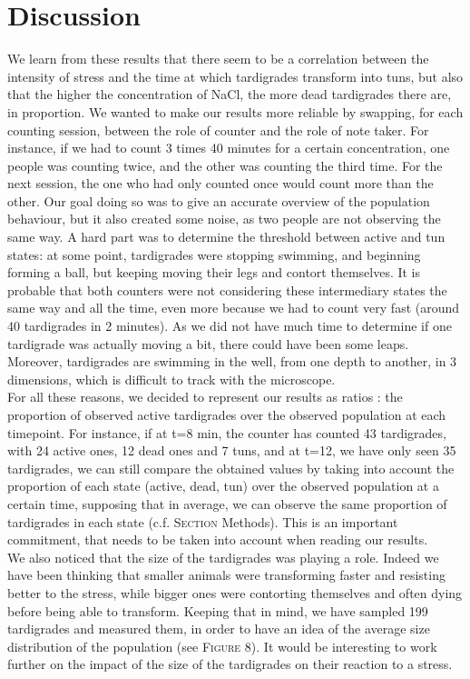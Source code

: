 \documentclass[12pt,a4paper, twocolumn]{article}
\begin{document}
\section{Discussion}
We learn from these results that there seem to be a correlation between the intensity of stress and the time at which tardigrades transform into tuns, but also that the higher the concentration of NaCl, the more dead tardigrades there are, in proportion. We wanted to make our results more reliable by swapping, for each counting session, between the role of counter and the role of note taker. For instance, if we had to count 3 times 40 minutes for a certain concentration, one people was counting twice, and the other was counting the third time. For the next session, the one who had only counted once would count more than the other. Our goal doing so was to give an accurate overview of the population behaviour, but it also created some noise, as two people are not observing the same way. A hard part was to determine the threshold between active and tun states: at some point, tardigrades were stopping swimming, and beginning forming a ball, but keeping moving their legs and contort themselves. It is probable that both counters were not considering these intermediary states the same way and all the time, even more because we had to count very fast (around 40 tardigrades in 2 minutes). As we did not have much time to determine if one tardigrade was actually moving a bit, there could have been some leaps. Moreover, tardigrades are swimming in the well, from one depth to another, in 3 dimensions, which is difficult to track with the microscope.\\

For all these reasons, we decided to represent our results as ratios : the proportion of observed active tardigrades over the observed population at each timepoint. For instance, if at t=8 min, the counter has counted 43 tardigrades, with 24 active ones, 12 dead ones and 7 tuns, and at t=12, we have only seen 35 tardigrades, we can still compare the obtained values by taking into account the proportion of each state (active, dead, tun) over the observed population at a certain time, supposing that in average, we can observe the same proportion of tardigrades in each state (c.f. \textsc{Section} Methods). This is an important commitment, that needs to be taken into account when reading our results.\\

We also noticed that the size of the tardigrades was playing a role. Indeed we have been thinking that smaller animals were transforming faster and resisting better to the stress, while bigger ones were contorting themselves and often dying before being able to transform. Keeping that in mind, we have sampled 199 tardigrades and measured them, in order to have an idea of the average size distribution of the population (see \textsc{Figure} 8). It would be interesting to work further on the impact of the size of the tardigrades on their reaction to a stress.\\
\end{document}
